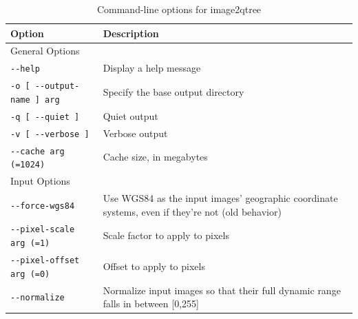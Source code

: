 \begin{longtable}{|l|p{7.5cm}|}
\caption{Command-line options for image2qtree}
\label{tbl:image2qtree}
\endfirsthead
\endhead
\endfoot
\endlastfoot
\hline
Option & Description \\ \hline \hline
General Options \\ \hline
\verb#--help# & Display a help message\\ \hline
\verb#-o [ --output-name ] arg# & Specify the base output directory\\ \hline
\verb#-q [ --quiet ]# & Quiet output\\ \hline
\verb#-v [ --verbose ]# & Verbose output\\ \hline
\verb#--cache arg (=1024)# & Cache size, in megabytes\\ \hline

Input Options\\ \hline
\verb#--force-wgs84# & Use WGS84 as the input images' geographic coordinate systems, even if they're not (old behavior)\\ \hline
\verb#--pixel-scale arg (=1)# & Scale factor to apply to pixels\\ \hline
\verb#--pixel-offset arg (=0)# & Offset to apply to pixels\\ \hline
\verb#--normalize# & Normalize input images so that their full dynamic range falls in between [0,255]\\ \hline


\end{longtable}
